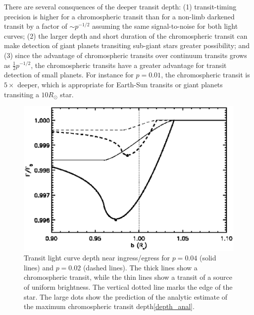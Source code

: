 \documentclass[manuscript]{aastex}
\begin{document}
There are several consquences of the deeper transit depth:
(1) transit-timing precision is higher for a chromospheric
transit than for a non-limb darkened transit by a factor of
$\sim p^{-1/2}$ assuming the same signal-to-noise for
both light curves; (2) the larger depth and short duration
of the chromospheric transit can make detection of giant
planets transiting sub-giant stars greater possibility;
and (3) since the advantage of chromospheric transits
over continuum transits grows as $\frac{1}{2}p^{-1/2}$,
the chromospheric transits have a greater advantage for
transit detection of small planets. For instance
for $p=0.01$, the chromospheric transit is $5\times$
deeper, which is appropriate for Earth-Sun transits
or giant planets transiting a $10R_\odot$ star.


\begin{figure}
\includegraphics[width=0.5 \textwidth]{comp_size.eps}
\caption{Transit light curve depth near ingress/egress
for $p=0.04$ (solid lines) and $p=0.02$ (dashed lines).
The thick lines show a chromospheric transit, while the
thin lines show a transit of a source of uniform brightness.
The vertical dotted line marks the edge of the star.
The large dots show the prediction of the analytic
estimate of the maximum chromospheric transit depth\ref{depth_anal}.}
\label{fig02}
\end{figure}
\end{document}
